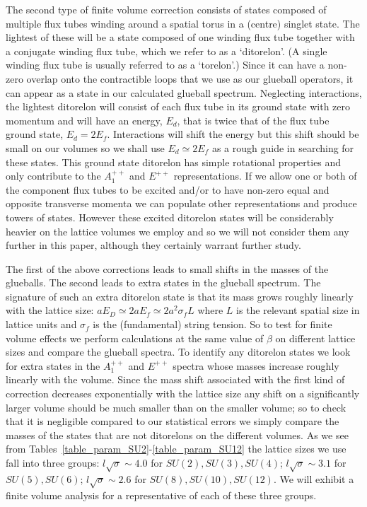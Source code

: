 \documentclass[12pt]{article}
\begin{document}
The second type of finite volume correction consists of states composed of multiple flux
tubes winding around a spatial torus in a (centre) singlet state. The lightest of these will be
a state composed of one winding flux tube together with a conjugate winding flux tube,
which we refer to as a `ditorelon'. (A single winding flux tube is usually
referred to as a `torelon'.) Since it can have a non-zero overlap onto the contractible
loops that we use as our glueball operators, it can appear as a state in our calculated
glueball spectrum. Neglecting interactions, the lightest ditorelon will consist
of each flux tube in its ground state with zero momentum and will have an energy, $E_d$, that
is twice that of the flux tube ground state, $E_d=2E_f$. Interactions will shift the energy
but this shift should be small on our volumes so we shall use $E_d\simeq 2E_f$ as a rough guide
in searching for these states. This ground state ditorelon has simple rotational properties
and only contribute to the $A_1^{++}$ and $E^{++}$ representations. If we allow one or
both of the component flux tubes to be excited and/or to have non-zero equal and opposite
transverse momenta we can populate other representations and produce towers of states.
However these excited ditorelon states will be considerably heavier on the lattice volumes
we employ and so we will not consider them any further in this paper, although they certainly
warrant further study.

The first of the above corrections leads to small shifts in the masses of the glueballs.
The second leads to extra states in the glueball spectrum. The signature of such an extra
ditorelon state is that its mass grows roughly linearly with the lattice size:
$aE_D \simeq 2aE_f \simeq 2 a^2\sigma_f L$ where $L$ is the relevant spatial size in lattice
units and  $\sigma_f$ is the (fundamental) string tension. So to test for finite volume effects
we perform calculations at the same value of $\beta$ on different lattice sizes and compare the
glueball spectra. To identify any ditorelon states we look for extra states in the $A_1^{++}$
and $E^{++}$ spectra whose masses increase roughly linearly with the volume. Since the mass
shift associated with the first kind of correction decreases exponentially with the lattice
size any shift on a significantly larger volume should be much smaller than on the smaller volume;
so to check that it is negligible compared to our statistical errors we simply compare the masses
of the states that are not ditorelons on the different volumes. As we see
from Tables~\ref{table_param_SU2}-\ref{table_param_SU12} the lattice sizes we use
fall into three groups: $l\surd\sigma \sim 4.0$ for $SU(2),SU(3),SU(4)$;
 $l\surd\sigma \sim 3.1$ for $SU(5),SU(6)$; $l\surd\sigma \sim 2.6$ for $SU(8),SU(10),SU(12)$.
We will exhibit a finite volume analysis for a representative of each of these three groups.
\end{document}
